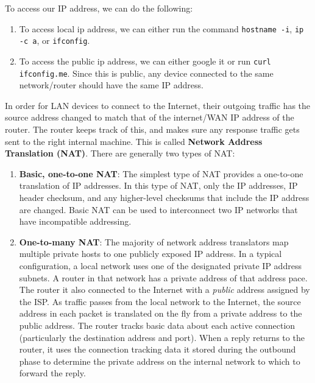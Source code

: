 \documentclass{article}
\begin{document}
      To access our IP address, we can do the following: 
      \begin{enumerate} 
        \item To access local ip address, we can either run the command \texttt{hostname -i}, \texttt{ip -c a}, or \texttt{ifconfig}.
          
        \item To access the public ip address, we can either google it or run \texttt{curl ifconfig.me}. Since this is public, any device connected to the same network/router should have the same IP address. 
      \end{enumerate}

      \begin{definition}[NAT]
        In order for LAN devices to connect to the Internet, their outgoing traffic has the source address changed to match that of the internet/WAN IP address of the router. The router keeps track of this, and makes sure any response traffic gets sent to the right internal machine. This is called \textbf{Network Address Translation (NAT)}. There are generally two types of NAT: 

        \begin{enumerate}
          \item \textbf{Basic, one-to-one NAT}: The simplest type of NAT provides a one-to-one translation of IP addresses. In this type of NAT, only the IP addresses, IP header checksum, and any higher-level checksums that include the IP address are changed. Basic NAT can be used to interconnect two IP networks that have incompatible addressing. 

          \item \textbf{One-to-many NAT}: The majority of network address translators map multiple private hosts to one publicly exposed IP address. In a typical configuration, a local network uses one of the designated private IP address subnets. A router in that network has a private address of that address pace. The router it also connected to the Internet with a \textit{public} address assigned by the ISP. As traffic passes from the local network to the Internet, the source address in each packet is translated on the fly from a private address to the public address. The router tracks basic data about each active connection (particularly the destination address and port). When a reply returns to the router, it uses the connection tracking data it stored during the outbound phase to determine the private address on the internal network to which to forward the reply. 
        \end{enumerate}
      \end{definition}
\end{document}
